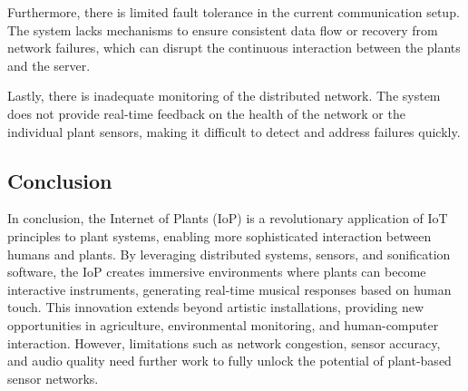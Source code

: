 Furthermore, there is limited fault tolerance in the current communication setup. The system lacks mechanisms to ensure consistent data flow or recovery from network failures, which can disrupt the continuous interaction between the plants and the server.

Lastly, there is inadequate monitoring of the distributed network. The system does not provide real-time feedback on the health of the network or the individual plant sensors, making it difficult to detect and address failures quickly.

\subsection{Conclusion}

In conclusion, the Internet of Plants (IoP) is a revolutionary application of IoT principles to plant systems, enabling more sophisticated interaction between humans and plants. By leveraging distributed systems, sensors, and sonification software, the IoP creates immersive environments where plants can become interactive instruments, generating real-time musical responses based on human touch. This innovation extends beyond artistic installations, providing new opportunities in agriculture, environmental monitoring, and human-computer interaction. However, limitations such as network congestion, sensor accuracy, and audio quality need further work to fully unlock the potential of plant-based sensor networks.


